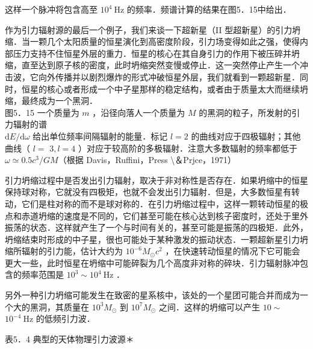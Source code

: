 这样一个脉冲将包含高至 $10^{4} \mathrm{~Hz}$ 的频率．频谱计算的结果在图5．15中给出．

作为引力辐射源的最后一个例子，我们来谈一下超新星（II 型超新星）的引力坍缩．当一颗几个太阳质量的恒星演化到高密度阶段，引力场变得如此之强，使得内部压力支持不住恒星外层的重力．恒星的核心在其自身引力的作用下被压碎并坍缩，直至达到原子核的密度，此时坍缩突然变慢或停止．这一突然停止产生一个冲击波，它向外传播并以剧烈爆炸的形式冲破恒星外层，我们就看到一颗超新星．同时，恒星的核心或者形成一个中子星那样的稳定结构，或者由于质量太大而继续坍缩，最终成为一个黑洞．\\


图5．15 一个质量为 $m$ ，沿径向落人一个质量为 $M$ 的黑洞的粒子，所发射的引力辐射的谱\\
$\mathrm{d} E / \mathrm{d} \omega$ 给出单位频率间隔辐射的能量．标记 $l=2$ 的曲线对应于四极辐射；其他曲线（ $l=$ $3, l=4$ ）对应于较高阶的多极辐射．注意大多数辐射的频率都低于 $\omega \simeq 0.5 c^{3} / G M$（根据 Davis，Ruffini，Press \textbackslash ＆Prjce，1971）

引力坍缩过程中是否发出引力辐射，取决于非对称性是否存在．如果坍缩中的恒星保持球对称，它就没有四极矩，也就不会发出引力辐射．但是，大多数恒星有转动，它们是柱对称的而不是球对称的．在引力坍缩过程中，这样一颗转动恒星的极点和赤道坍缩的速度是不同的，它们甚至可能在核心达到核子密度时，还处于里外振荡的状态．这样就产生了一个与时间有关的，甚至可能是振荡的四极矩．此外，坍缩结束时形成的中子星，很也可能处于某种激发的振动状态．一颗超新星引力坍缩所辐射的引力能，估计大约为 $10^{-6} M_{\odot} c^{2}$ ，在快速转动恒星的情况下它可能会更大一些，此时恒星在坍缩中可能碎裂为几个高度非对称的碎块．引力辐射脉冲包含的频率范围是 $10^{3} \sim 10^{4} \mathrm{~Hz}$ ．

另外一种引力坍缩可能发生在致密的星系核中，该处的一个星团可能合并而成为一个大的黑洞，其质量在 $10^{3} M_{\odot}$ 到 $10^{7} M_{\odot}$ 之间．这样的坍缩可以产生 $10 \sim$\\
$10^{-4} \mathrm{~Hz}$ 的低频引力波．

表5．4 典型的天体物理引力波源＊

